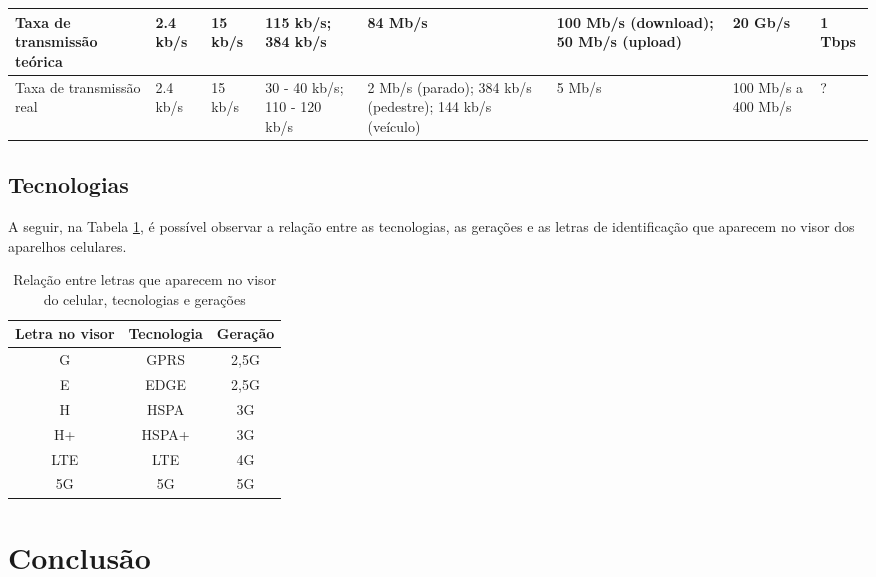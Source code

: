 \documentclass[11pt,oneside,a4paper]{abntex2}
\begin{document}
\begin{center}
\begin{longtable}{|m{1.6cm}|m{1.6cm}|m{1.6cm}|m{1.6cm}|m{1.6cm}|m{1.6cm}|m{1.6cm}|m{1.6cm}|}
Taxa de transmissão teórica & 2.4 kb/s                                                                            & 15 kb/s                     & 115 kb/s; 384 kb/s           & 84 Mb/s                                                  & 100 Mb/s (download); 50 Mb/s (upload)            & 20 Gb/s                           & 1 Tbps             \\ \hline
Taxa de transmissão real    & 2.4 kb/s                                                                            & 15 kb/s                     & 30 - 40 kb/s; 110 - 120 kb/s & 2 Mb/s (parado); 384 kb/s (pedestre); 144 kb/s (veículo) & 5 Mb/s                                           & 100 Mb/s a 400 Mb/s               & ?                  \\ \hline
\end{longtable}
\end{center}

\subsection*{Tecnologias}

A seguir, na Tabela \ref{sopa-letrinhas-2}, é possível observar a relação entre as tecnologias, as gerações e as letras de identificação que aparecem no visor dos aparelhos celulares.

\begin{table}[htb!]
\caption{Relação entre letras que aparecem no visor do celular, tecnologias e gerações}
\label{sopa-letrinhas-2}
\begin{center}
\begin{tabular}{||c||c||c||}
	\hline
	\textbf{Letra no visor} & \textbf{Tecnologia} & \textbf{Geração} \\
	\hline
	\hline
	G & GPRS & 2,5G \\
	\hline
	E & EDGE & 2,5G \\
	\hline
	H & HSPA & 3G \\
	\hline
	H+ & HSPA+ & 3G \\
	\hline
	LTE & LTE & 4G \\
	\hline
	5G & 5G & 5G \\
	\hline
\end{tabular}
\end{center}
\end{table}

\section*{Conclusão}
\label{conclusao}
\end{document}
